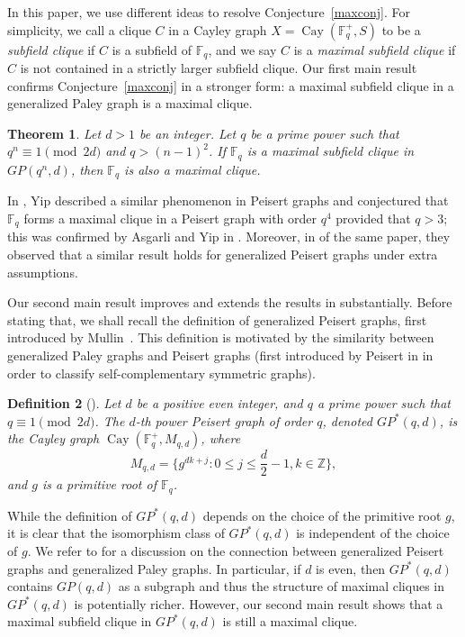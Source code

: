 \documentclass[12pt,reqno]{amsart}
\newtheorem{thm}{Theorem}[section]
\newtheorem{defn}[thm]{Definition}
\newcommand{\Z}{\mathbb{Z}}
\newcommand{\F}{\mathbb{F}}
\begin{document}
In this paper, we use different ideas to resolve Conjecture~\ref{maxconj}. For simplicity, we call a clique $C$ in a Cayley graph $X=\operatorname{Cay}(\F_q^+,S)$ to be a \emph{subfield clique} if $C$ is a subfield of $\F_{q}$, and we say $C$ is a \emph{maximal subfield clique} if $C$ is not contained in a strictly larger subfield clique. Our first main result confirms Conjecture~\ref{maxconj} in a stronger form: a maximal subfield clique in a generalized Paley graph is a maximal clique. 

\begin{thm}\label{main1}
Let $d>1$ be an integer. Let $q$ be a prime power such that $q^n \equiv 1 \pmod {2d}$ and $q>(n-1)^2$. If $\F_q$ is a maximal subfield clique in $GP(q^n,d)$, then $\F_q$ is also a maximal clique. 
\end{thm}

In \cite[Theorem 1.7]{Y22}, Yip described a similar phenomenon in Peisert graphs and conjectured that $\F_q$ forms a maximal clique in a Peisert graph with order $q^4$ provided that $q>3$; this was confirmed by Asgarli and Yip in \cite[Theorem 1.5]{AY}. Moreover, in \cite[Section 5]{AY} of the same paper, they observed that a similar result holds for generalized Peisert graphs under extra assumptions. 

Our second main result improves and extends the results in \cite[Section 5]{AY} substantially. Before stating that, we shall recall the definition of generalized Peisert graphs, first introduced by Mullin~\cite{NM}. This definition is motivated by the similarity between generalized Paley graphs and Peisert graphs (first introduced by Peisert in \cite{WP2} in order to classify self-complementary symmetric graphs).

\begin{defn}[{\cite[Definition 2.11]{AY}}]\rm
Let $d$ be a positive even integer, and $q$ a prime power such that $q \equiv 1 \pmod {2d}$. The {\em $d$-th power Peisert graph of order $q$}, denoted $GP^*(q,d)$, is the Cayley graph $\operatorname{Cay}(\F_q^+, M_{q,d})$, where
$$
M_{q,d}=\bigg\{g^{dk+j}: 0\leq j \leq \frac{d}{2}-1, k \in \Z\bigg\},
$$
and $g$ is a primitive root of $\F_q$.
\end{defn}

While the definition of $GP^*(q,d)$ depends on the choice of the primitive root $g$, it is clear that the isomorphism class of $GP^*(q,d)$ is independent of the choice of $g$. We refer to \cite[Remark 2.12]{AY} for a discussion on the connection between generalized Peisert graphs and generalized Paley graphs. In particular, if $d$ is even, then $GP^*(q,d)$ contains $GP(q,d)$ as a subgraph and thus the structure of maximal cliques in $GP^*(q,d)$ is potentially richer. However, our second main result shows that a maximal subfield clique in $GP^*(q,d)$ is still a maximal clique. 
\end{document}
